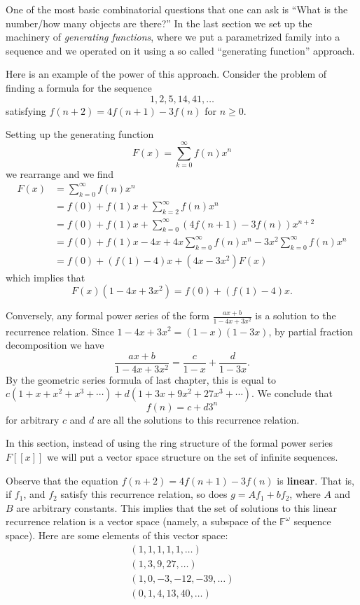 One of the most basic combinatorial questions that one can ask is ``What is the number/how many objects are there?''
In the last section we set up the machinery of \textit{generating functions}, where we put a parametrized family into a sequence and we operated on it using a so called ``generating function'' approach.

Here is an example of the power of this approach. Consider the problem of finding a formula for the sequence
\[1, 2, 5, 14, 41, \dots\]
satisfying $f(n+2) = 4f(n + 1) - 3f(n)$ for $n \geq 0$.

Setting up the generating function 
\[F(x) = \sum_{k = 0}^{\infty}f(n)x^n\] we rearrange and we find
\begin{align*}
F(x) &= \sum_{k = 0}^{\infty}f(n)x^n \\
&= f(0) + f(1)x + \sum_{k = 2}^{\infty}f(n)x^n \\
&= f(0) + f(1)x + \sum_{k = 0}^{\infty}(4f(n + 1) - 3f(n))x^{n + 2} \\
&= f(0) + f(1)x - 4x + 4x\sum_{k = 0}^{\infty}f(n)x^n - 3x^2\sum_{k = 0}^{\infty}f(n)x^n \\
&= f(0) + (f(1) - 4)x + (4x - 3x^2)F(x)
\end{align*}
which implies that 
\[F(x)(1 - 4x + 3x^2) = f(0) + (f(1) - 4)x.\]

Conversely, any formal power series of the form $\frac{ax + b}{1 - 4x + 3x^2}$ is a solution to the recurrence relation. Since $1 - 4x + 3x^2 = (1-x)(1-3x)$, by partial fraction decomposition we have
\[\frac{ax + b}{1 - 4x + 3x^2} = \frac{c}{1-x} + \frac{d}{1-3x}.\] By the geometric series formula of last chapter, this is equal to $c(1 + x + x^2 + x^3 + \cdots) + d(1 + 3x + 9x^2 + 27x^3 + \cdots)$. We conclude that 
\[f(n) = c + d3^n\] for arbitrary $c$ and $d$ are all the solutions to this recurrence relation.


In this section, instead of using the ring structure of the formal power series $F[[x]]$ we will put a vector space structure on the set of infinite sequences.

Observe that the equation $f(n + 2) = 4f(n + 1) - 3f(n)$ is \textbf{linear}. That is, if $f_1$, and $f_2$ satisfy this recurrence relation, so does $g = Af_1 + bf_2$, where $A$ and $B$ are arbitrary constants. This implies that the set of solutions to this linear recurrence relation is a vector space (namely, a subspace of the $\mathbb{F}^{\omega}$ sequence space). Here are some elements of this vector space:
\begin{align*}
(1, 1, 1, 1, 1, \dots) \\
(1, 3, 9, 27, \dots) \\
(1, 0, -3, -12, -39, \dots) \\
(0, 1, 4, 13, 40, \dots) \\
\end{align*}

